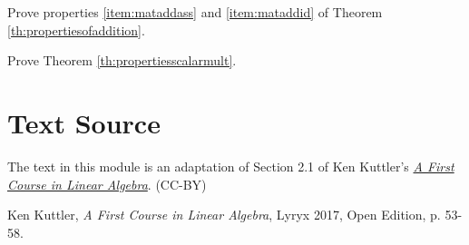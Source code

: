 \documentclass{ximera}
\begin{document}
\begin{problem}\label{prob:proofmataddass}
Prove properties \ref{item:mataddass} and  \ref{item:mataddid} of Theorem \ref{th:propertiesofaddition}.
\end{problem}

\begin{problem}\label{prob:proofpropertiesscalarmult}
Prove Theorem \ref{th:propertiesscalarmult}.
\end{problem}

\section*{Text Source}
The text in this module is an adaptation of Section 2.1 of Ken Kuttler's \href{https://open.umn.edu/opentextbooks/textbooks/a-first-course-in-linear-algebra-2017}{\it A First Course in Linear Algebra}. (CC-BY)

Ken Kuttler, {\it  A First Course in Linear Algebra}, Lyryx 2017, Open Edition, p. 53-58.
\end{document}
